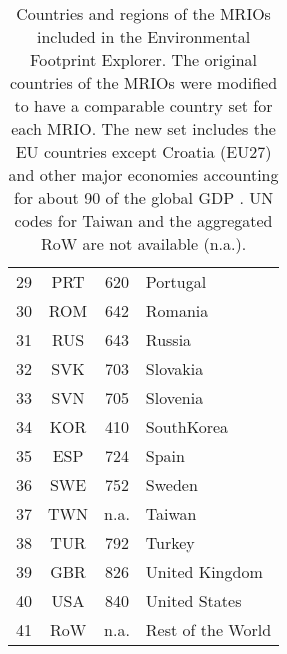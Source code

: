 \begin{table}
\begin{tabular}{ c c c l }
29&PRT & 620 & Portugal\\
30&ROM & 642 & Romania\\
31&RUS & 643 & Russia\\
32&SVK & 703 & Slovakia\\
33&SVN & 705 & Slovenia\\
34&KOR & 410 & SouthKorea\\
35&ESP & 724 & Spain\\
36&SWE & 752 & Sweden\\
37&TWN & n.a. & Taiwan\\
38&TUR & 792 & Turkey\\
39&GBR & 826 & United Kingdom\\
40&USA & 840 & United States\\
41& RoW & n.a. & Rest of the World\\
\end{tabular}

\caption{Countries and regions of the MRIOs included in the Environmental Footprint Explorer. 
The original countries of the MRIOs were modified to have a comparable country set for each MRIO. The new set includes the EU countries except Croatia (EU27) and other major economies accounting for about 90 of the global GDP \cite{Stadler_2014}. UN codes for Taiwan and the aggregated RoW are not available (n.a.).}
\end{table}



